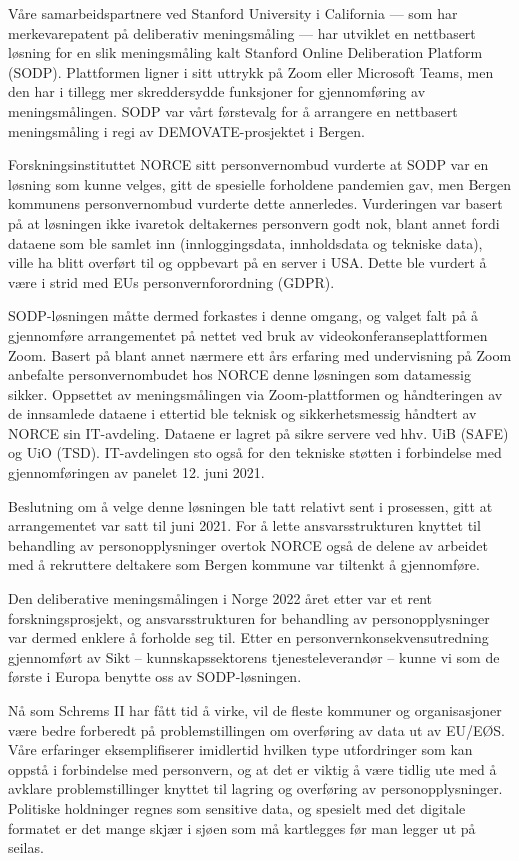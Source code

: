 \documentclass[
  12pt,
  a4paper, 12pt]{article}
\begin{document}
Våre samarbeidspartnere ved Stanford University i California --- som har merkevarepatent på deliberativ meningsmåling --- har utviklet en nettbasert løsning for en slik meningsmåling kalt Stanford Online Deliberation Platform (SODP). Plattformen ligner i sitt uttrykk på Zoom eller Microsoft Teams, men den har i tillegg mer skreddersydde funksjoner for gjennomføring av meningsmålingen. SODP var vårt førstevalg for å arrangere en nettbasert meningsmåling i regi av DEMOVATE-prosjektet i Bergen.

Forskningsinstituttet NORCE sitt personvernombud vurderte at SODP var en løsning som kunne velges, gitt de spesielle forholdene pandemien gav, men Bergen kommunens personvernombud vurderte dette annerledes. Vurderingen var basert på at løsningen ikke ivaretok deltakernes personvern godt nok, blant annet fordi dataene som ble samlet inn (innloggingsdata, innholdsdata og tekniske data), ville ha blitt overført til og oppbevart på en server i USA. Dette ble vurdert å være i strid med EUs personvernforordning (GDPR).

SODP-løsningen måtte dermed forkastes i denne omgang, og valget falt på å gjennomføre arrangementet på nettet ved bruk av videokonferanseplattformen Zoom. Basert på blant annet nærmere ett års erfaring med undervisning på Zoom anbefalte personvernombudet hos NORCE denne løsningen som datamessig sikker. Oppsettet av meningsmålingen via Zoom-plattformen og håndteringen av de innsamlede dataene i ettertid ble teknisk og sikkerhetsmessig håndtert av NORCE sin IT-avdeling. Dataene er lagret på sikre servere ved hhv. UiB (SAFE) og UiO (TSD). IT-avdelingen sto også for den tekniske støtten i forbindelse med gjennomføringen av panelet 12. juni 2021.

Beslutning om å velge denne løsningen ble tatt relativt sent i prosessen, gitt at arrangementet var satt til juni 2021. For å lette ansvarsstrukturen knyttet til behandling av personopplysninger overtok NORCE også de delene av arbeidet med å rekruttere deltakere som Bergen kommune var tiltenkt å gjennomføre.

Den deliberative meningsmålingen i Norge 2022 året etter var et rent forskningsprosjekt, og ansvarsstrukturen for behandling av personopplysninger var dermed enklere å forholde seg til. Etter en personvernkonsekvensutredning gjennomført av Sikt -- kunnskapssektorens tjenesteleverandør -- kunne vi som de første i Europa benytte oss av SODP-løsningen.

Nå som Schrems II har fått tid å virke, vil de fleste kommuner og organisasjoner være bedre forberedt på problemstillingen om overføring av data ut av EU/EØS. Våre erfaringer eksemplifiserer imidlertid hvilken type utfordringer som kan oppstå i forbindelse med personvern, og at det er viktig å være tidlig ute med å avklare problemstillinger knyttet til lagring og overføring av personopplysninger. Politiske holdninger regnes som sensitive data, og spesielt med det digitale formatet er det mange skjær i sjøen som må kartlegges før man legger ut på seilas.
\end{document}
